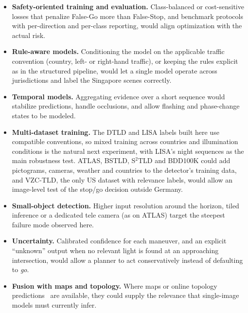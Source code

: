 \begin{itemize}
  \item \textbf{Safety-oriented training and evaluation.} Class-balanced or cost-sensitive losses that
        penalize False-Go more than False-Stop, and benchmark protocols with per-direction and
        per-class reporting, would align optimization with the actual risk.
  \item \textbf{Rule-aware models.} Conditioning the model on the applicable traffic convention (country,
        left- or right-hand traffic), or keeping the rules explicit as in the structured pipeline, would
        let a single model operate across jurisdictions and label the Singapore scenes correctly.
  \item \textbf{Temporal models.} Aggregating evidence over a short sequence would stabilize predictions,
        handle occlusions, and allow flashing and phase-change states to be modeled.
  \item \textbf{Multi-dataset training.} The DTLD and LISA labels built here use compatible conventions,
        so mixed training across countries and illumination conditions is the natural next experiment,
        with LISA's night sequences as the main robustness test. ATLAS, BSTLD, S$^2$TLD and BDD100K
        could add pictograms, cameras, weather and countries to the detector's training data, and
        VZC-TLD, the only US dataset with relevance labels, would allow an image-level test of the
        stop/go decision outside Germany.
  \item \textbf{Small-object detection.} Higher input resolution around the horizon, tiled inference or
        a dedicated tele camera (as on ATLAS) target the steepest failure mode observed here.
  \item \textbf{Uncertainty.} Calibrated confidence for each maneuver, and an explicit ``unknown'' output
        when no relevant light is found at an approaching intersection, would allow a planner to act
        conservatively instead of defaulting to \emph{go}.
  \item \textbf{Fusion with maps and topology.} Where maps or online topology
        predictions~\cite{li2023graph,wu2024topomlp} are available, they could supply the relevance that
        single-image models must currently infer.
\end{itemize}
